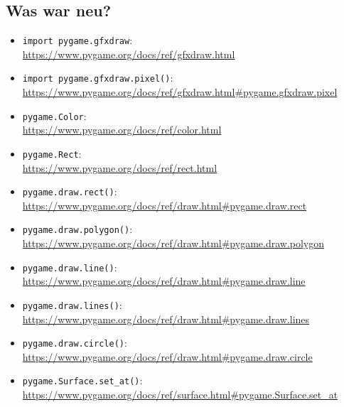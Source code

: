\subsection*{Was war neu?}

\begin{itemize}
	\item \texttt{import pygame.gfxdraw}:\\ \url{https://www.pygame.org/docs/ref/gfxdraw.html}
	
	\item \texttt{import pygame.gfxdraw.pixel()}:\\ \url{https://www.pygame.org/docs/ref/gfxdraw.html#pygame.gfxdraw.pixel}
	
	\item \texttt{pygame.Color}:
	\\
	\url{https://www.pygame.org/docs/ref/color.html}
	
	\item \texttt{pygame.Rect}:
	\\
	\url{https://www.pygame.org/docs/ref/rect.html}
	
	\item \texttt{pygame.draw.rect()}:
	\\
	\url{https://www.pygame.org/docs/ref/draw.html#pygame.draw.rect}
	
	\item \texttt{pygame.draw.polygon()}:
	\\
	\url{https://www.pygame.org/docs/ref/draw.html#pygame.draw.polygon}
	
	\item \texttt{pygame.draw.line()}:
	\\
	\url{https://www.pygame.org/docs/ref/draw.html#pygame.draw.line}
	
	\item \texttt{pygame.draw.lines()}:
	\\
	\url{https://www.pygame.org/docs/ref/draw.html#pygame.draw.lines}
	
	\item \texttt{pygame.draw.circle()}:
	\\
	\url{https://www.pygame.org/docs/ref/draw.html#pygame.draw.circle}
	
	\item \texttt{pygame.Surface.set\_at()}:
	\\
	\url{https://www.pygame.org/docs/ref/surface.html#pygame.Surface.set_at}
	
\end{itemize}


